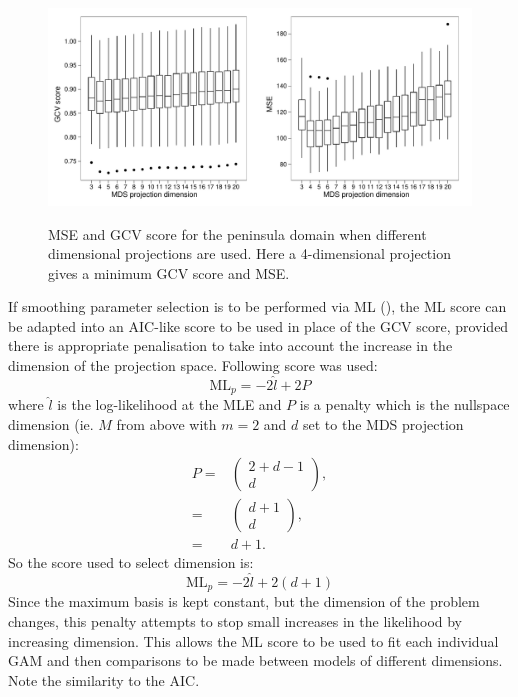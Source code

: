 \begin{figure}
\centering
\includegraphics[width=6in]{mds/figs/wt2-gcv-projdim-boxplot.pdf} \\
\caption{MSE and GCV score for the peninsula domain when different dimensional projections are used. Here a 4-dimensional projection gives a minimum GCV score and MSE.}
\label{wt2-gcv-projdim-boxplot}
\end{figure}

If smoothing parameter selection is to be performed via ML (\cite{remlpaper}), the ML score can be adapted into an AIC-like score to be used in place of the GCV score, provided there is appropriate penalisation to take into account the increase in the dimension of the projection space. Following score was used:
\begin{equation*}
\text{ML}_p = -2 \hat{l} + 2P
\end{equation*}
where $\hat{l}$ is the log-likelihood at the MLE and $P$ is a penalty which is the nullspace dimension (ie. $M$ from above with $m=2$ and $d$ set to the MDS projection dimension):
\begin{align*}
P =& \begin{pmatrix} 2+d-1 \\ d  \end{pmatrix},\\
=& \begin{pmatrix} d+1 \\ d  \end{pmatrix},\\
=& d+1.
\end{align*}
So the score used to select dimension is:
\begin{equation*}
\text{ML}_p = -2 \hat{l} + 2(d+1)
\end{equation*}
Since the maximum basis is kept constant, but the dimension of the problem changes, this penalty attempts to stop small increases in the likelihood by increasing dimension. This allows the ML score to be used to fit each individual GAM and then comparisons to be made between models of different dimensions. Note the similarity to the AIC.

